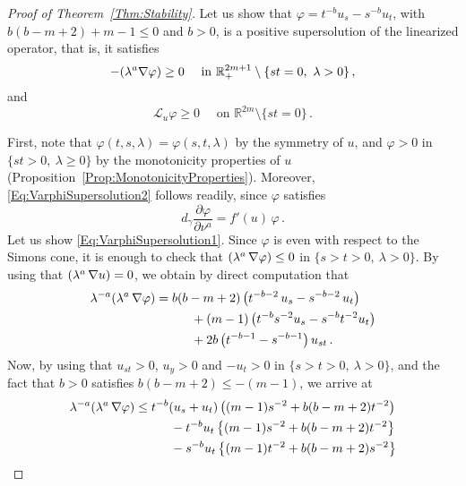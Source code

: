 \documentclass[12pt,reqno]{amsart}
\theoremstyle{definition}
\theoremstyle{remark}
\newcommand{\con}[1]{\mathbb{#1}}
\newcommand{\R}{\con{R}} %
\newcommand{\s}{\gamma}
\let\div\relax
\DeclareMathOperator{\div}{div}
\numberwithin{equation}{section}
\begin{document}
\begin{proof}[Proof of Theorem~\ref{Thm:Stability}]

Let us show that $\varphi = t^{-b}u_s - s^{-b}u_t$, with $b(b-m+2)+m-1\leq 0$ and $b>0$, is a positive supersolution of the linearized operator, that is, it satisfies 
\begin{equation}
\label{Eq:VarphiSupersolution1}
-\div(\lambda^a \nabla \varphi) \geq 0 \quad \text{ in } \R^{2m+1}_+\setminus \{st=0, \ \lambda >0\}\,,
\end{equation} 
and  
\begin{equation}
\label{Eq:VarphiSupersolution2}
\mathscr{L}_u \varphi \geq 0 \quad \text{ on } \R^{2m}  \setminus \{st=0\}\,.
\end{equation} 

First, note that $ \varphi(t,s,\lambda) = \varphi(s,t,\lambda) $ by the symmetry of $u$, and $\varphi>0$ in $\{st>0, \ \lambda \geq0\}$ by the monotonicity properties of $u$ (Proposition~\ref{Prop:MonotonicityProperties}). Moreover, \eqref{Eq:VarphiSupersolution2} follows readily, since $\varphi$  satisfies 
$$ 
d_\s \frac{\partial \varphi}{\partial \nu^a} = f'(u)\,\varphi\,. 
$$
Let us show \eqref{Eq:VarphiSupersolution1}. Since $\varphi$ is even with respect to the Simons cone, it is enough to check that $\div{(\lambda^a\,\nabla\varphi)}\leq 0$ in $\{s>t>0, \ \lambda >0\}$. By using that $\div(\lambda^a\,\nabla u) = 0$, we obtain by direct computation that 
\begin{align*}
\lambda^{-a} \div(\lambda^a\,\nabla \varphi) &= b(b-m+2) \left( t^{-b-2}\,u_s - s^{-b-2}\,u_t \right) \\
& \hspace{10mm} + (m-1) \left( t^{-b} s^{-2} u_s - s^{-b} t^{-2} u_t \right) \\
& \hspace{10mm} + 2b \left( t^{-b-1} - s^{-b-1} \right) u_{st}\,.
\end{align*}
Now, by using that $u_{st}>0$, $u_y>0$ and $-u_t>0$ in $\{s>t>0, \ \lambda >0\}$, and the fact that $b>0$ satisfies $b(b-m+2)\leq -(m-1) $, we arrive at
\begin{align*}
\lambda^{-a} \div(\lambda^a\,\nabla \varphi) &\leq t^{-b} (u_s+u_t) \left( (m-1) s^{-2} + b(b-m+2) t^{-2}\right) \\
& \hspace{10mm} - t^{-b} u_t \left\{ (m-1) s^{-2} + b(b-m+2) t^{-2} \right\} \\
& \hspace{10mm} - s^{-b} u_t \left\{ (m-1) t^{-2} + b(b-m+2) s^{-2} \right\} \\

\end{align*}
\end{proof}
\end{document}
